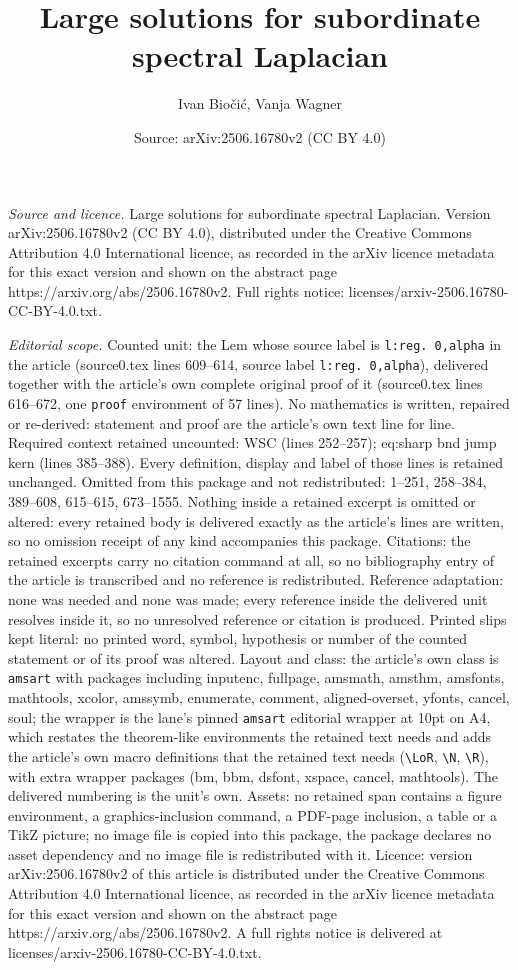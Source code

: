 \documentclass[10pt,a4paper]{amsart}
\title[Large solutions for subordinate spectral Laplacian]{Large solutions for subordinate spectral Laplacian}
\author{Ivan Bio\v{c}i\'c, Vanja Wagner}
\date{Source: arXiv:2506.16780v2 (CC BY 4.0)}
\begin{document}
\maketitle

\noindent\emph{Source and licence.} Large solutions for subordinate spectral Laplacian. Version arXiv:2506.16780v2 (CC BY 4.0), distributed under the Creative Commons Attribution 4.0 International licence, as recorded in the arXiv licence metadata for this exact version and shown on the abstract page https://arxiv.org/abs/2506.16780v2. Full rights notice: licenses/arxiv-2506.16780-CC-BY-4.0.txt.\par\smallskip

\noindent\textit{Editorial scope.} Counted unit: the Lem whose source label is \texttt{l:reg. 0,alpha} in the article (source0.tex lines 609--614, source label \texttt{l:reg. 0,alpha}), delivered together with the article's own complete original proof of it (source0.tex lines 616--672, one \texttt{proof} environment of 57 lines). No mathematics is written, repaired or re-derived: statement and proof are the article's own text line for line. Required context retained uncounted: WSC (lines 252--257); eq:sharp bnd jump kern (lines 385--388). Every definition, display and label of those lines is retained unchanged. Omitted from this package and not redistributed: 1--251, 258--384, 389--608, 615--615, 673--1555. Nothing inside a retained excerpt is omitted or altered: every retained body is delivered exactly as the article's lines are written, so no omission receipt of any kind accompanies this package. Citations: the retained excerpts carry no citation command at all, so no bibliography entry of the article is transcribed and no reference is redistributed. Reference adaptation: none was needed and none was made; every reference inside the delivered unit resolves inside it, so no unresolved reference or citation is produced. Printed slips kept literal: no printed word, symbol, hypothesis or number of the counted statement or of its proof was altered. Layout and class: the article's own class is \texttt{amsart} with packages including inputenc, fullpage, amsmath, amsthm, amsfonts, mathtools, xcolor, amssymb, enumerate, comment, aligned-overset, yfonts, cancel, soul; the wrapper is the lane's pinned \texttt{amsart} editorial wrapper at 10pt on A4, which restates the theorem-like environments the retained text needs and adds the article's own macro definitions that the retained text needs (\texttt{\textbackslash LoR}, \texttt{\textbackslash N}, \texttt{\textbackslash R}), with extra wrapper packages (bm, bbm, dsfont, xspace, cancel, mathtools). The delivered numbering is the unit's own. Assets: no retained span contains a figure environment, a graphics-inclusion command, a PDF-page inclusion, a table or a TikZ picture; no image file is copied into this package, the package declares no asset dependency and no image file is redistributed with it. Licence: version arXiv:2506.16780v2 of this article is distributed under the Creative Commons Attribution 4.0 International licence, as recorded in the arXiv licence metadata for this exact version and shown on the abstract page https://arxiv.org/abs/2506.16780v2. A full rights notice is delivered at licenses/arxiv-2506.16780-CC-BY-4.0.txt. 
\end{document}
